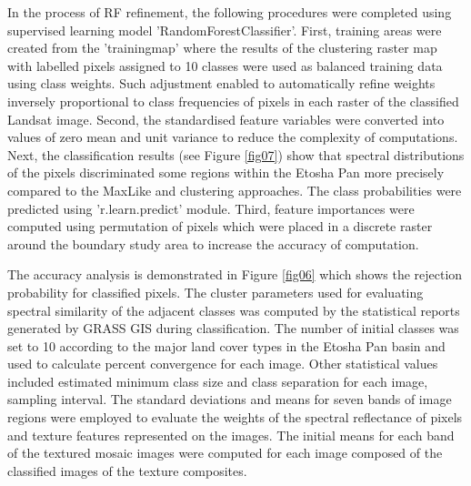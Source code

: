 \documentclass[draft]{agujournal2019}
\begin{document}
In the process of RF refinement, the following procedures were completed using supervised learning model 'RandomForestClassifier'. First, training areas were created from the 'trainingmap' where the results of the clustering raster map with labelled pixels assigned to 10 classes were used as balanced training data using class weights. Such adjustment enabled to automatically refine weights inversely proportional to class frequencies of pixels in each raster of the classified Landsat image. Second, the standardised feature variables were converted into values of zero mean and unit variance to reduce the complexity of computations. Next, the classification results (see Figure \ref{fig07}) show that spectral distributions of the pixels discriminated some regions within the Etosha Pan more precisely compared to the MaxLike and clustering approaches. The class probabilities were predicted using 'r.learn.predict' module. Third, feature importances were computed using permutation of pixels which were placed in a discrete raster around the boundary study area  to increase the accuracy of computation. 

The accuracy analysis is demonstrated in Figure \ref{fig06} which shows the rejection probability for classified pixels. The cluster parameters used for evaluating spectral similarity of the adjacent classes was computed by the statistical reports generated by GRASS GIS during classification. The number of initial classes was set to 10 according to the major land cover types in the Etosha Pan basin and used to calculate percent convergence for each image. Other statistical values included estimated minimum class size and class separation for each image, sampling interval. The standard deviations and means for seven bands of image regions were employed to evaluate the weights of the spectral reflectance of pixels and texture features represented on the images. The initial means for each band of the textured mosaic images were computed for each image composed of the classified images of the texture composites. 
\end{document}

